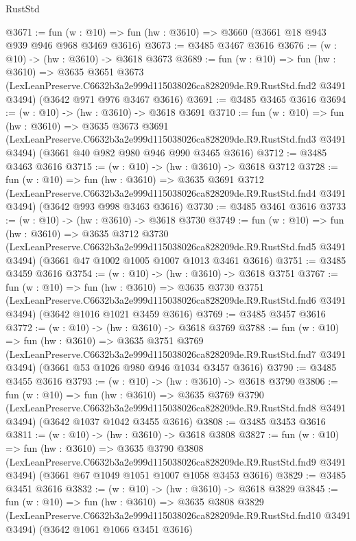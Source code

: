 \begin{lexlean}{RustStd}
\begin{coremodule}
@3671 := fun (w : @10) => fun (hw : @3610) => @3660 (@3661 @18 @943 @939 @946 @968 @3469 @3616)
@3673 := @3485 @3467 @3616
@3676 := (w : @10) -> (hw : @3610) -> @3618 @3673
@3689 := fun (w : @10) =>
  fun (hw : @3610) =>
  @3635
    @3651
    @3673
    (LexLeanPreserve.C6632b3a2e999d115038026ca828209de.R9.RustStd.fnd2 @3491 @3494)
    (@3642 @971 @976 @3467 @3616)
@3691 := @3485 @3465 @3616
@3694 := (w : @10) -> (hw : @3610) -> @3618 @3691
@3710 := fun (w : @10) =>
  fun (hw : @3610) =>
  @3635
    @3673
    @3691
    (LexLeanPreserve.C6632b3a2e999d115038026ca828209de.R9.RustStd.fnd3 @3491 @3494)
    (@3661 @40 @982 @980 @946 @990 @3465 @3616)
@3712 := @3485 @3463 @3616
@3715 := (w : @10) -> (hw : @3610) -> @3618 @3712
@3728 := fun (w : @10) =>
  fun (hw : @3610) =>
  @3635
    @3691
    @3712
    (LexLeanPreserve.C6632b3a2e999d115038026ca828209de.R9.RustStd.fnd4 @3491 @3494)
    (@3642 @993 @998 @3463 @3616)
@3730 := @3485 @3461 @3616
@3733 := (w : @10) -> (hw : @3610) -> @3618 @3730
@3749 := fun (w : @10) =>
  fun (hw : @3610) =>
  @3635
    @3712
    @3730
    (LexLeanPreserve.C6632b3a2e999d115038026ca828209de.R9.RustStd.fnd5 @3491 @3494)
    (@3661 @47 @1002 @1005 @1007 @1013 @3461 @3616)
@3751 := @3485 @3459 @3616
@3754 := (w : @10) -> (hw : @3610) -> @3618 @3751
@3767 := fun (w : @10) =>
  fun (hw : @3610) =>
  @3635
    @3730
    @3751
    (LexLeanPreserve.C6632b3a2e999d115038026ca828209de.R9.RustStd.fnd6 @3491 @3494)
    (@3642 @1016 @1021 @3459 @3616)
@3769 := @3485 @3457 @3616
@3772 := (w : @10) -> (hw : @3610) -> @3618 @3769
@3788 := fun (w : @10) =>
  fun (hw : @3610) =>
  @3635
    @3751
    @3769
    (LexLeanPreserve.C6632b3a2e999d115038026ca828209de.R9.RustStd.fnd7 @3491 @3494)
    (@3661 @53 @1026 @980 @946 @1034 @3457 @3616)
@3790 := @3485 @3455 @3616
@3793 := (w : @10) -> (hw : @3610) -> @3618 @3790
@3806 := fun (w : @10) =>
  fun (hw : @3610) =>
  @3635
    @3769
    @3790
    (LexLeanPreserve.C6632b3a2e999d115038026ca828209de.R9.RustStd.fnd8 @3491 @3494)
    (@3642 @1037 @1042 @3455 @3616)
@3808 := @3485 @3453 @3616
@3811 := (w : @10) -> (hw : @3610) -> @3618 @3808
@3827 := fun (w : @10) =>
  fun (hw : @3610) =>
  @3635
    @3790
    @3808
    (LexLeanPreserve.C6632b3a2e999d115038026ca828209de.R9.RustStd.fnd9 @3491 @3494)
    (@3661 @67 @1049 @1051 @1007 @1058 @3453 @3616)
@3829 := @3485 @3451 @3616
@3832 := (w : @10) -> (hw : @3610) -> @3618 @3829
@3845 := fun (w : @10) =>
  fun (hw : @3610) =>
  @3635
    @3808
    @3829
    (LexLeanPreserve.C6632b3a2e999d115038026ca828209de.R9.RustStd.fnd10 @3491 @3494)
    (@3642 @1061 @1066 @3451 @3616)

\end{coremodule}
\end{lexlean}

